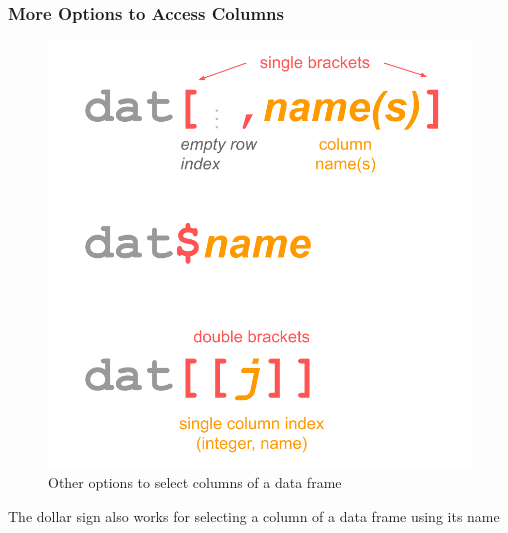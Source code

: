 \documentclass[
]{book}
\newenvironment{Shaded}{\begin{snugshade}}{\end{snugshade}}
\newcommand{\DecValTok}[1]{\textcolor[rgb]{0.00,0.00,0.81}{#1}}
\newcommand{\FloatTok}[1]{\textcolor[rgb]{0.00,0.00,0.81}{#1}}
\newcommand{\NormalTok}[1]{#1}
\newcommand{\SpecialCharTok}[1]{\textcolor[rgb]{0.00,0.00,0.00}{#1}}
\begin{document}
\hypertarget{more-options-to-access-columns}{%
\subsubsection*{More Options to Access Columns}\label{more-options-to-access-columns}}

\begin{figure}

{\centering \includegraphics[width=0.5\linewidth]{images/objects/obj-dataframe-names} 

}

\caption{Other options to select columns of a data frame}\label{fig:unnamed-chunk-183}
\end{figure}

The dollar sign also works for selecting a column of a data frame
using its name

\begin{Shaded}
\end{Shaded}
\end{document}
